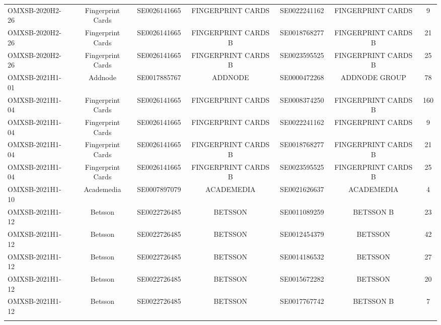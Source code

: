 \begin{threeparttable}
\begin{tabular}{@{}lcccccc}
\addlinespace[0.25ex]
\addlinespace[0.25ex]
OMXSB-2020H2-26 & Fingerprint Cards & SE0026141665 & FINGERPRINT CARDS & SE0022241162 & FINGERPRINT CARDS & 9 \\
\addlinespace[0.25ex]
\addlinespace[0.25ex]
OMXSB-2020H2-26 & Fingerprint Cards & SE0026141665 & FINGERPRINT CARDS B & SE0018768277 & FINGERPRINT CARDS B & 21 \\
\addlinespace[0.25ex]
\addlinespace[0.25ex]
OMXSB-2020H2-26 & Fingerprint Cards & SE0026141665 & FINGERPRINT CARDS B & SE0023595525 & FINGERPRINT CARDS B & 25 \\
\addlinespace[0.25ex]
\addlinespace[0.25ex]
OMXSB-2021H1-01 & Addnode & SE0017885767 & ADDNODE & SE0000472268 & ADDNODE GROUP & 78 \\
\addlinespace[0.25ex]
\addlinespace[0.25ex]
OMXSB-2021H1-04 & Fingerprint Cards & SE0026141665 & FINGERPRINT CARDS & SE0008374250 & FINGERPRINT CARDS B & 160 \\
\addlinespace[0.25ex]
\addlinespace[0.25ex]
OMXSB-2021H1-04 & Fingerprint Cards & SE0026141665 & FINGERPRINT CARDS & SE0022241162 & FINGERPRINT CARDS & 9 \\
\addlinespace[0.25ex]
\addlinespace[0.25ex]
OMXSB-2021H1-04 & Fingerprint Cards & SE0026141665 & FINGERPRINT CARDS B & SE0018768277 & FINGERPRINT CARDS B & 21 \\
\addlinespace[0.25ex]
\addlinespace[0.25ex]
OMXSB-2021H1-04 & Fingerprint Cards & SE0026141665 & FINGERPRINT CARDS B & SE0023595525 & FINGERPRINT CARDS B & 25 \\
\addlinespace[0.25ex]
\addlinespace[0.25ex]
OMXSB-2021H1-10 & Academedia & SE0007897079 & ACADEMEDIA & SE0021626637 & ACADEMEDIA & 4 \\
\addlinespace[0.25ex]
\addlinespace[0.25ex]
OMXSB-2021H1-12 & Betsson & SE0022726485 & BETSSON & SE0011089259 & BETSSON B & 23 \\
\addlinespace[0.25ex]
\addlinespace[0.25ex]
OMXSB-2021H1-12 & Betsson & SE0022726485 & BETSSON & SE0012454379 & BETSSON & 42 \\
\addlinespace[0.25ex]
\addlinespace[0.25ex]
OMXSB-2021H1-12 & Betsson & SE0022726485 & BETSSON & SE0014186532 & BETSSON & 27 \\
\addlinespace[0.25ex]
\addlinespace[0.25ex]
OMXSB-2021H1-12 & Betsson & SE0022726485 & BETSSON & SE0015672282 & BETSSON & 20 \\
\addlinespace[0.25ex]
\addlinespace[0.25ex]
OMXSB-2021H1-12 & Betsson & SE0022726485 & BETSSON & SE0017767742 & BETSSON B & 7 \\
\addlinespace[0.25ex]

\end{tabular}
\end{threeparttable}

